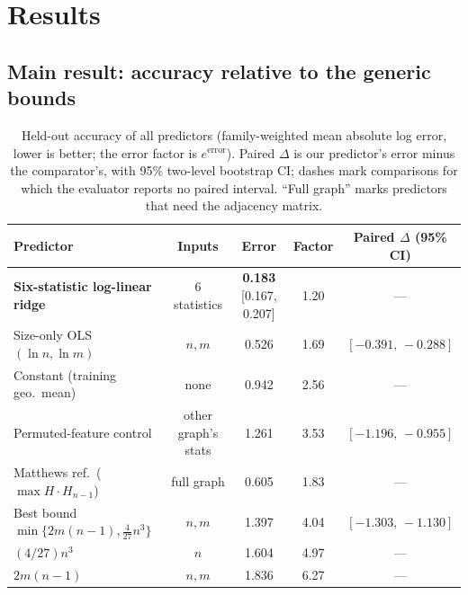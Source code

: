 \documentclass{article}
\begin{document}
\section{Results}
\label{sec:results}

\subsection{Main result: accuracy relative to the generic bounds}
\label{sec:main}

\begin{table}[t]
\centering
\caption{Held-out accuracy of all predictors (family-weighted mean absolute log error, lower is better; the error factor is $e^{\text{error}}$). Paired $\Delta$ is our predictor's error minus the comparator's, with 95\% two-level bootstrap CI; dashes mark comparisons for which the evaluator reports no paired interval. ``Full graph'' marks predictors that need the adjacency matrix.}
\label{tab:main}
\small
\begin{tabular}{lcccc}
\toprule
Predictor & Inputs & Error & Factor & Paired $\Delta$ (95\% CI) \\
\midrule
\textbf{Six-statistic log-linear ridge} & 6 statistics & \textbf{0.183} [0.167, 0.207] & 1.20 & --- \\
Size-only OLS $(\ln n,\ln m)$ & $n, m$ & 0.526 & 1.69 & $[-0.391,\,-0.288]$ \\
Constant (training geo.\ mean) & none & 0.942 & 2.56 & --- \\
Permuted-feature control & other graph's stats & 1.261 & 3.53 & $[-1.196,\,-0.955]$ \\
\midrule
Matthews ref.\ ($\max H\cdot H_{n-1}$) & full graph & 0.605 & 1.83 & --- \\
Best bound $\min\{2m(n-1), \tfrac{4}{27}n^3\}$ & $n, m$ & 1.397 & 4.04 & $[-1.303,\,-1.130]$ \\
$(4/27)n^3$ & $n$ & 1.604 & 4.97 & --- \\
$2m(n-1)$ & $n, m$ & 1.836 & 6.27 & --- \\
\bottomrule
\end{tabular}
\end{table}
\end{document}
